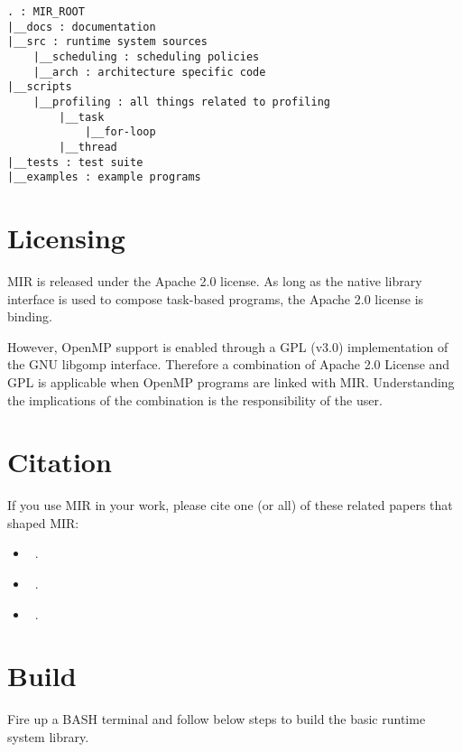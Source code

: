 \documentclass[11pt,a4paper]{article}
\begin{document}
\begin{lstlisting}[style=MyInputStyle]
. : MIR_ROOT
|__docs : documentation
|__src : runtime system sources
    |__scheduling : scheduling policies
    |__arch : architecture specific code
|__scripts
    |__profiling : all things related to profiling
        |__task
            |__for-loop
        |__thread
|__tests : test suite
|__examples : example programs
\end{lstlisting}

\section{Licensing}\label{sec:license}
MIR is released under the Apache 2.0 license.  As long as the native library interface is used to compose task-based programs, the Apache 2.0 license is binding.

However, OpenMP support is enabled through a GPL (v3.0) implementation of the GNU libgomp interface. Therefore a combination of Apache 2.0 License and GPL is applicable when OpenMP programs are linked with MIR. Understanding the implications of the combination is the responsibility of the user.

\section{Citation}

If you use MIR in your work, please cite one (or all) of these related papers that shaped MIR:
\begin{itemize}
\item ~.
\item ~.
\item ~.
\end{itemize}


\section{Build}\label{sec:build}

Fire up a BASH terminal and follow below steps to build the basic runtime system library.
\end{document}
